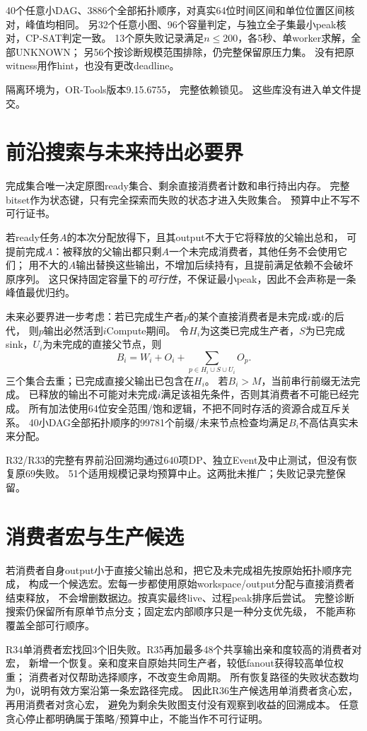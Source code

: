 \documentclass[UTF8,fontset=fandol,11pt]{ctexart}
\begin{document}
40个任意小DAG、3886个全部拓扑顺序，对真实64位时间区间和单位位置区间核对，峰值均相同。
另32个任意小图、96个容量判定，与独立全子集最小peak核对，CP-SAT判定一致。
13个原失败记录满足$n\le200$，各5秒、单worker求解，全部UNKNOWN；
另56个按诊断规模范围排除，仍完整保留原压力集。
没有把原witness用作hint，也没有更改deadline。

隔离环境为，OR-Tools版本9.15.6755，
完整依赖锁见。
这些库没有进入单文件提交。

\section{前沿搜索与未来持出必要界}
完成集合唯一决定原图ready集合、剩余直接消费者计数和串行持出内存。
完整bitset作为状态键，只有完全探索而失败的状态才进入失败集合。
预算中止不写不可行证书。

若ready任务$A$的本次分配放得下，且其output不大于它将释放的父输出总和，
可提前完成$A$：被释放的父输出都只剩$A$一个未完成消费者，其他任务不会使用它们；
用不大的$A$输出替换这些输出，不增加后续持有，且提前满足依赖不会破坏原序列。
这只保持固定容量下的\emph{可行性}，不保证最小peak，因此不会声称是一条峰值最优归约。

未来必要界进一步考虑：若已完成生产者$p$的某个直接消费者是未完成$i$或$i$的后代，
则$p$输出必然活到$i$Compute期间。
令$H_i$为这类已完成生产者，$S$为已完成sink，$U_i$为未完成的直接父节点，则
\[
 B_i=W_i+O_i+\sum_{p\in H_i\cup S\cup U_i}O_p.
\]
三个集合去重；已完成直接父输出已包含在$H_i$。
若$B_i>M$，当前串行前缀无法完成。
已释放的输出不可能对未完成$i$满足该祖先条件，否则其消费者不可能已经完成。
所有加法使用64位安全范围/饱和逻辑，不把不同时存活的资源合成互斥关系。
40小DAG全部拓扑顺序的99781个前缀/未来节点检查均满足$B_i$不高估真实未来分配。

R32/R33的完整有界前沿回溯均通过640项DP、独立Event及中止测试，但没有恢复原69失败。
51个适用规模记录均预算中止。这两批未推广；失败记录完整保留。

\section{消费者宏与生产候选}
若消费者自身output小于直接父输出总和，把它及未完成祖先按原始拓扑顺序完成，
构成一个候选宏。宏每一步都使用原始workspace/output分配与直接消费者结束释放，
不会增删数据边。按真实最终live、过程peak排序后尝试。
完整诊断搜索仍保留所有原单节点分支；固定宏内部顺序只是一种分支优先级，
不能声称覆盖全部可行顺序。

R34单消费者宏找回3个旧失败。R35再加最多48个共享输出亲和度较高的消费者对宏，
新增一个恢复。亲和度来自原始共同生产者，较低fanout获得较高单位权重；
消费者对仅帮助选择顺序，不改变生命周期。
所有恢复路径的失败状态数均为0，说明有效方案沿第一条宏路径完成。
因此R36生产候选用单消费者贪心宏，再用消费者对贪心宏，
避免为剩余失败图支付没有观察到收益的回溯成本。
任意贪心停止都明确属于策略/预算中止，不能当作不可行证明。
\end{document}
